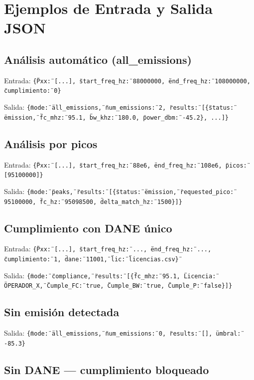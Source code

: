\section{Ejemplos de Entrada y Salida JSON}

\subsection{Análisis automático (all\_emissions)}

Entrada: \texttt{\{\"Pxx\": [...], \"start\_freq\_hz\": 88000000, \"end\_freq\_hz\": 108000000, \"cumplimiento\": 0\}}

Salida: \texttt{\{\"mode\": \"all\_emissions\", \"num\_emissions\": 2, \"results\": [\{\"status\": \"emission\", \"fc\_mhz\": 95.1, \"bw\_khz\": 180.0, \"power\_dbm\": -45.2\}, ...]\}}

\subsection{Análisis por picos}

Entrada: \texttt{\{\"Pxx\": [...], \"start\_freq\_hz\": 88e6, \"end\_freq\_hz\": 108e6, \"picos\": [95100000]\}}

Salida: \texttt{\{\"mode\": \"peaks\", \"results\": [\{\"status\": \"emission\", \"requested\_pico\": 95100000, \"fc\_hz\": 95098500, \"delta\_match\_hz\": 1500\}]\}}

\subsection{Cumplimiento con DANE único}

Entrada: \texttt{\{\"Pxx\": [...], \"start\_freq\_hz\": ..., \"end\_freq\_hz\": ..., \"cumplimiento\": 1, \"dane\": \"11001\", \"lic\": \"licencias.csv\"\}}

Salida: \texttt{\{\"mode\": \"compliance\", \"results\": [\{\"fc\_mhz\": 95.1, \"Licencia\": \"OPERADOR\_X\", \"Cumple\_FC\": true, \"Cumple\_BW\": true, \"Cumple\_P\": false\}]\}}

\subsection{Sin emisión detectada}

Salida: \texttt{\{\"mode\": \"all\_emissions\", \"num\_emissions\": 0, \"results\": [], \"umbral\": -85.3\}}

\subsection{Sin DANE — cumplimiento bloqueado}

